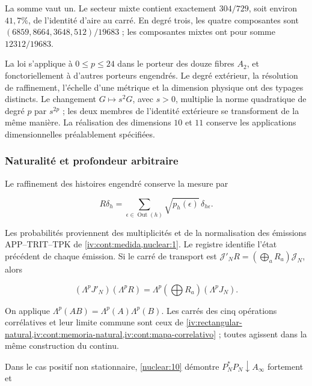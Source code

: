 La somme vaut un. Le secteur mixte contient exactement \(304/729\),
soit environ \(41{,}7\%\), de l’identité d’aire au carré.
En degré trois, les quatre composantes sont
\((6859,8664,3648,512)/19683\) ; les composantes mixtes ont pour somme
\(12312/19683\).


La loi s’applique à \(0\le p\le24\) dans le porteur des douze
fibres \(A_2\), et fonctoriellement à d’autres porteurs engendrés.
Le degré extérieur, la résolution de raffinement, l’échelle d’une
métrique et la dimension physique ont des typages distincts.
Le changement \(G\mapsto s^2G\), avec \(s>0\), multiplie la norme
quadratique de degré \(p\) par \(s^{2p}\) ; les deux membres de
l’identité extérieure se transforment de la même manière.
La réalisation des dimensions \(10\) et \(11\) conserve les
applications dimensionnelles préalablement spécifiées.

\subsubsection{Naturalité et profondeur arbitraire}

Le raffinement des histoires engendré conserve la mesure par



\[
R\delta_h=\sum_{\epsilon\in\operatorname{Out}(h)}
\sqrt{p_h(\epsilon)}\,\delta_{h\epsilon}.
\]



Les probabilités proviennent des multiplicités et de la
normalisation des émissions APP--TRIT--TPK de
\cref{iv:cont:medida,nuclear:1}.
Le registre identifie l’état précédent de chaque émission.
Si le carré de transport est
\(\mathcal J'_NR=(\bigoplus_aR_a)\mathcal J_N\), alors



\begin{equation}
(\Lambda^pJ'_N)(\Lambda^pR)
=\Lambda^p(\bigoplus R_a)(\Lambda^pJ_N).
\label{nuc11:eq:23}
\end{equation}



On applique
\(\Lambda^p(AB)=\Lambda^p(A)\Lambda^p(B)\).
Les carrés des cinq opérations corrélatives et leur limite
commune sont ceux de
\cref{iv:rectangular-natural,iv:cont:memoria-natural,iv:cont:mapa-correlativo} ; toutes agissent dans la même construction
du continu.


Dans le cas positif non stationnaire,
\cref{nuclear:10} démontre
\(P_N^*P_N\downarrow A_\infty\) fortement et



